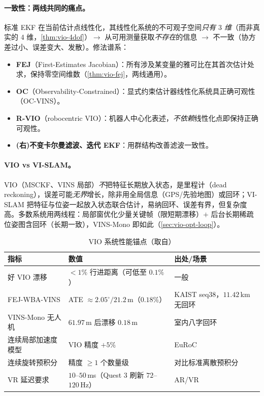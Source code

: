 \paragraph{一致性：两线共同的痛点。}
标准 EKF 在当前估计点线性化，其线性化系统的不可观子空间\emph{只有 $3$ 维}（而非真实的 $4$ 维，\cref{thm:vio-4dof}）$\to$ 从可用测量获取\emph{不存在}的信息 $\to$ 不一致（协方差过小、误差变大、发散）\cite{huang2019vins}。修法谱系：
\begin{itemize}
  \item \textbf{FEJ}（First-Estimates Jacobian）：所有涉及某变量的雅可比在其首次估计处求，保持零空间维数（\cref{thm:vio-fej}，两线通用）。
  \item \textbf{OC}（Observability-Constrained）：显式约束估计器线性化系统具正确可观性（OC-VINS）。
  \item \textbf{R-VIO}（robocentric VIO）：机器人中心化表述，\emph{不依赖}线性化点即保持正确可观性。
  \item \textbf{(右)不变卡尔曼滤波、迭代 EKF}：用群结构改善滤波一致性。
\end{itemize}

\paragraph{VIO vs VI-SLAM。}
VIO（MSCKF、VINS 局部）\emph{不}把特征长期放入状态，是里程计（dead reckoning），误差可能\emph{无界}增长，除非用全局信息（GPS/先验地图）或回环；VI-SLAM 把特征与位姿一起放入状态联合估计，易纳回环、误差有界，但复杂度高。多数系统用两线程：局部窗优化少量关键帧（限短期漂移）$+$ 后台长期稀疏位姿图含回环（长期一致），VINS-Mono 即如此（\cref{sec:vio-opt-loop}）。

\begin{table}[H]\centering\small
\caption{VIO 系统性能锚点（取自\cite{carlone2026handbook,qin2018vins}）}
\label{tab:vio-performance}
\begin{tabular}{lll}
\toprule
指标 & 数值 & 出处/场景 \\
\midrule
好 VIO 漂移 & $<1\%$ 行进距离（可低至 $0.1\%$） & 一般\cite{carlone2026handbook} \\
FEJ-WBA-VINS & ATE $\approx2.05^\circ/21.2\,$m（$0.18\%$） & KAIST seq38，$11.42\,$km 无回环 \\
VINS-Mono 无人机 & $61.97\,$m 后漂移 $0.18\,$m & 室内八字回环 \\
连续局部加速度模型 & VIO 精度 $+5\%$ & EuRoC \\
连续旋转预积分 & 精度 $\ge1$ 个数量级 & 对比标准离散预积分 \\
VR 延迟要求 & $10$--$50\,$ms（Quest 3 刷新 $72$--$120\,$Hz）& AR/VR \\
\bottomrule
\end{tabular}
\end{table}

